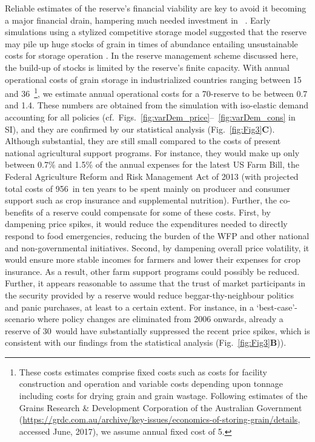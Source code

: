 \documentclass[12pt]{article}
\begin{document}
Reliable estimates of the reserve's financial viability are key to avoid it becoming a major financial drain, hampering much needed investment in \RD~\cite{WRI12}. Early simulations using a stylized competitive storage model suggested that the reserve may pile up huge stocks of grain in times of abundance entailing unsustainable costs for storage operation \cite{WIL91}. In the reserve management scheme discussed here, the build-up of stocks is limited by the reserve's finite capacity. With annual operational costs of grain storage in industrialized countries ranging between 15 \cite{WIG09} and 36\USDmt~\cite{THO10}\footnote{These costs estimates comprise fixed
  costs such as costs for facility construction and operation and variable costs depending upon
  tonnage including costs for drying grain and grain wastage. Following estimates of the Grains
  Research \& Development Corporation of the Australian Government
  (\url{https://grdc.com.au/archive/key-issues/economics-of-storing-grain/details}, accessed June,
  2017), we assume annual fixed cost of 5\USDmt.}, we estimate annual operational costs for a 70\mmt-reserve to be between 0.7 and 1.4\bnUSD. These numbers are obtained from the simulation with iso-elastic demand accounting for all policies (cf.~Figs.~\ref{fig:varDem_price}--~\ref{fig:varDem_cons} in SI), and they are confirmed by our statistical analysis (Fig.~\ref{fig:Fig3}\textbf{C}). Although substantial, they are still small compared to the costs of present national agricultural support programs. For instance, they would make up only between 0.7\% and 1.5\% of the annual expenses for the latest US Farm Bill, the Federal Agriculture Reform and Risk Management Act of 2013 (with projected total costs of 956\bnUSD~in ten years to be spent mainly on producer and consumer support such as crop insurance and supplemental nutrition). Further, the co-benefits of a reserve could compensate for some of these costs. First, by dampening price spikes, it would reduce the expenditures needed to directly respond to food emergencies, reducing the burden of the WFP and other national and non-governmental initiatives. Second, by dampening overall price volatility, it would ensure more stable incomes for farmers and lower their expenses for crop insurance. As a result, other farm support programs could possibly be reduced. Further, it appears reasonable to assume that the trust of market participants in the security provided by a reserve would reduce beggar-thy-neighbour politics and panic purchases, at least to a certain extent. For instance, in a `best-case'-scenario where policy changes are eliminated from 2006 onwards, already a reserve of 30\mmt~would have substantially suppressed the recent price spikes, which is consistent with our findings from the statistical analysis (Fig.~\ref{fig:Fig3}\textbf{B})).
\end{document}
